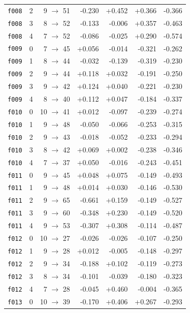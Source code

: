 \documentclass[11pt]{article}
\begin{document}
\begin{table}[htbp]
\begin{tabular}{llrrrrr}
\texttt{f008} & 2 & 9 $\to$ 51 & -0.230 & +0.452 & +0.366 & -0.366 \\
\texttt{f008} & 3 & 8 $\to$ 52 & -0.133 & -0.006 & +0.357 & -0.463 \\
\texttt{f008} & 4 & 7 $\to$ 52 & -0.086 & -0.025 & +0.290 & -0.574 \\
\texttt{f009} & 0 & 7 $\to$ 45 & +0.056 & -0.014 & -0.321 & -0.262 \\
\texttt{f009} & 1 & 8 $\to$ 44 & -0.032 & -0.139 & -0.319 & -0.230 \\
\texttt{f009} & 2 & 9 $\to$ 44 & +0.118 & +0.032 & -0.191 & -0.250 \\
\texttt{f009} & 3 & 9 $\to$ 42 & +0.124 & +0.040 & -0.221 & -0.230 \\
\texttt{f009} & 4 & 8 $\to$ 40 & +0.112 & +0.047 & -0.184 & -0.337 \\
\texttt{f010} & 0 & 10 $\to$ 41 & +0.012 & -0.097 & -0.239 & -0.274 \\
\texttt{f010} & 1 & 9 $\to$ 48 & -0.050 & -0.066 & -0.253 & -0.315 \\
\texttt{f010} & 2 & 9 $\to$ 43 & -0.018 & -0.052 & -0.233 & -0.294 \\
\texttt{f010} & 3 & 8 $\to$ 42 & +0.069 & +0.002 & -0.238 & -0.346 \\
\texttt{f010} & 4 & 7 $\to$ 37 & +0.050 & -0.016 & -0.243 & -0.451 \\
\texttt{f011} & 0 & 9 $\to$ 45 & +0.048 & +0.075 & -0.149 & -0.493 \\
\texttt{f011} & 1 & 9 $\to$ 48 & +0.014 & +0.030 & -0.146 & -0.530 \\
\texttt{f011} & 2 & 9 $\to$ 65 & -0.661 & +0.159 & -0.149 & -0.527 \\
\texttt{f011} & 3 & 9 $\to$ 60 & -0.348 & +0.230 & -0.149 & -0.520 \\
\texttt{f011} & 4 & 9 $\to$ 53 & -0.307 & +0.308 & -0.114 & -0.487 \\
\texttt{f012} & 0 & 10 $\to$ 27 & -0.026 & -0.026 & -0.107 & -0.250 \\
\texttt{f012} & 1 & 9 $\to$ 28 & +0.012 & -0.005 & -0.148 & -0.297 \\
\texttt{f012} & 2 & 9 $\to$ 34 & -0.188 & +0.102 & -0.119 & -0.273 \\
\texttt{f012} & 3 & 8 $\to$ 34 & -0.101 & -0.039 & -0.180 & -0.323 \\
\texttt{f012} & 4 & 7 $\to$ 28 & -0.045 & +0.460 & -0.004 & -0.365 \\
\texttt{f013} & 0 & 10 $\to$ 39 & -0.170 & +0.406 & +0.267 & -0.293 \\

\end{tabular}
\end{table}
\end{document}
